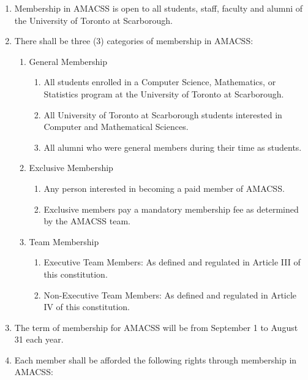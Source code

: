 \documentclass[12pt,a4paper]{article}
\begin{document}
\begin{enumerate}
\item Membership in AMACSS is open to all students, staff, faculty and alumni of the University of Toronto at Scarborough.

\item There shall be three (3) categories of membership in AMACSS:

\begin{enumerate}
\item General Membership

\begin{enumerate}
\item All students enrolled in a Computer Science, Mathematics, or Statistics program at the University of Toronto at Scarborough.

\item All University of Toronto at Scarborough students interested in Computer and Mathematical Sciences.

\item All alumni who were general members during their time as students.
\end{enumerate}

\item Exclusive Membership

\begin{enumerate}
\item Any person interested in becoming a paid member of AMACSS.

\item Exclusive members pay a mandatory membership fee as determined by the AMACSS team.
\end{enumerate}

\item Team Membership

\begin{enumerate}
\item Executive Team Members: As defined and regulated in Article III of this constitution.

\item Non-Executive Team Members: As defined and regulated in Article IV of this constitution.
\end{enumerate}
\end{enumerate}

\item The term of membership for AMACSS will be from September 1 to August 31 each year.

\item Each member shall be afforded the following rights through membership in AMACSS:


\end{enumerate}
\end{document}
